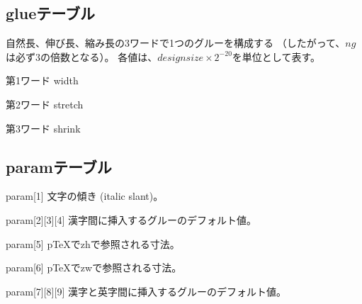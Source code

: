 \documentclass[a4paper,11pt,nomag]{jsarticle}
\begin{document}
\subsection{glueテーブル}
自然長、伸び長、縮み長の3ワードで1つのグルーを構成する
（したがって、$ng$は必ず3の倍数となる）。
各値は、$design size\times2^{-20}$を単位として表す。
\begin{description}
\item{第1ワード} width
\item{第2ワード} stretch
\item{第3ワード} shrink
\end{description}
%
\subsection{paramテーブル}
\begin{description}
\item{param[1]} 文字の傾き (italic slant)。
\item{param[2][3][4]} 漢字間に挿入するグルーのデフォルト値。
\item{param[5]} p\TeX{}でzhで参照される寸法。
\item{param[6]} p\TeX{}でzwで参照される寸法。
\item{param[7][8][9]} 漢字と英字間に挿入するグルーのデフォルト値。
\end{description}
%
\newpage
\end{document}
